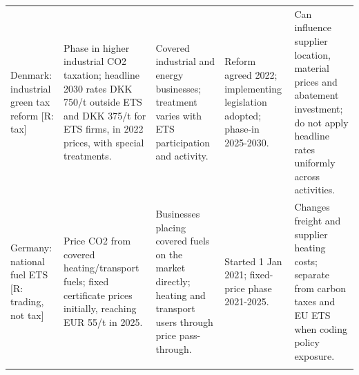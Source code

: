 \documentclass[10pt,a4paper,landscape]{article}
\begin{document}
\begin{tabularx}{\textwidth}{Y{0.85}Y{1.00}Y{0.85}Y{1.05}Y{1.25}}
Denmark: industrial green tax reform [R: tax]\cite{denmarktax} & Phase in higher industrial CO2 taxation; headline 2030 rates DKK 750/t outside ETS and DKK 375/t for ETS firms, in 2022 prices, with special treatments. & Covered industrial and energy businesses; treatment varies with ETS participation and activity. & Reform agreed 2022; implementing legislation adopted; phase-in 2025-2030. & Can influence supplier location, material prices and abatement investment; do not apply headline rates uniformly across activities. \\
\addlinespace[5pt]
Germany: national fuel ETS [R: trading, not tax]\cite{germanyprice,germanystart} & Price CO2 from covered heating/transport fuels; fixed certificate prices initially, reaching EUR 55/t in 2025. & Businesses placing covered fuels on the market directly; heating and transport users through price pass-through. & Started 1 Jan 2021; fixed-price phase 2021-2025. & Changes freight and supplier heating costs; separate from carbon taxes and EU ETS when coding policy exposure. \\
\addlinespace[5pt]
\end{tabularx}
\normalsize

\clearpage
\end{document}
